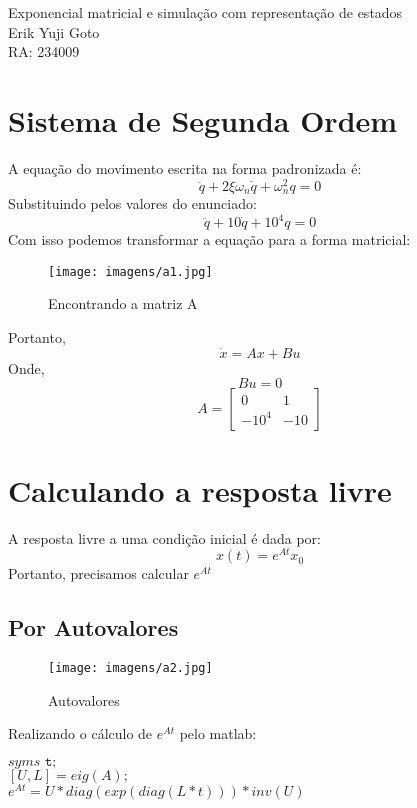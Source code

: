 \documentclass[a4paper, 12pt]{article}
\begin{document}
	\begin{center} %
		{\Large Exponencial matricial e simulação com representação de estados}\\[0.4cm]
		{\large Erik Yuji Goto}\\[0.2cm]
		{\normalsize RA: 234009}
	\end{center} %

\section{Sistema de Segunda Ordem}
	A equação do movimento escrita na forma padronizada é:	
	\begin{equation}
		\ddot{q} + 2\xi \omega_n \dot{q} + \omega_n^2q = 0
	\end{equation}
	Substituindo pelos valores do enunciado:	
	\begin{equation}
		\ddot{q} + 10\dot{q} + 10^4q = 0
	\end{equation}
	Com isso podemos transformar a equação para a forma matricial:
	\begin{figure}[h]
		\centering
		\texttt{[image: imagens/a1.jpg]}
		\caption{Encontrando a matriz A}
	\end{figure}
	\newpage
	Portanto,
	\begin{equation}
		\dot{x} = Ax + Bu
	\end{equation}
	Onde,
	\begin{equation}
		Bu = 0
	\end{equation}
	\begin{equation}
		A = \begin{bmatrix}
		0 & 1\\
		-10^4 & -10
		\end{bmatrix}
	\end{equation}

\section{Calculando a resposta livre}
	A resposta livre a uma condição inicial é dada por:
	\begin{equation}
		x(t) = e^{At} x_0
	\end{equation}
	Portanto, precisamos calcular $e^{At}$
	
	\subsection{Por Autovalores}
		\begin{figure}[h]
			\centering
			\texttt{[image: imagens/a2.jpg]}
			\caption{Autovalores}
		\end{figure}
		Realizando o cálculo de $e^{At}$ pelo matlab:
		\begin{center}
			$syms \texttt{ t};$\\
			$[U,L] = eig(A);$\\
			$e^{At} = U*diag(exp(diag(L*t)))*inv(U)$\\
		\end{center}				
		
\end{document}
